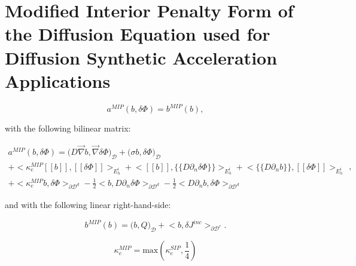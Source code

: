 \section{Modified Interior Penalty Form of the Diffusion Equation used for Diffusion Synthetic Acceleration Applications}
\label{sec::DSA_MIP}

\begin{equation}
a^{MIP}( b, \delta \Phi) = b^{MIP}(b),
\label{eq::MIP_weak_form}
\end{equation}

\noindent with the following bilinear matrix:

\begin{equation}
\label{eq::MIP_bilinear_form}
\begin{aligned}
a^{MIP}(b, \delta \Phi)  = \Big(  D \vec{\nabla} b , \vec{\nabla} \delta \Phi  \Big)_{\mathcal{D}} + \Big(  \sigma b , \delta \Phi  \Big)_{\mathcal{D}}    \\
+  \Big< \kappa_e^{MIP} [\![   b ]\!] , [\![  \delta \Phi ]\!]\Big>_{E_h^i} + \Big<  [\![  b ]\!] , \{\!\{  D \partial_n \delta \Phi \}\!\}\Big>_{E_h^i}  + \Big< \{\!\{  D \partial_n b \}\!\} , [\![ \delta \Phi ]\!]\Big>_{E_h^i} \\
+ \Big< \kappa_e^{MIP}  b , \delta  \Phi \Big>_{\partial \mathcal{D}^d} - \frac{1}{2} \Big<  b ,  D \partial_n \delta \Phi \Big>_{\partial \mathcal{D}^d} - \frac{1}{2} \Big<   D \partial_n b , \delta \Phi \Big>_{\partial \mathcal{D}^d}  
\end{aligned} ,
\end{equation}

\noindent and with the following linear right-hand-side:

\begin{equation}
\label{eq::MIP_linear_form}
b^{MIP} (b) = \Big(  b, Q  \Big)_{\mathcal{D}}  + \Big< b, \delta  J^{inc}  \Big>_{\partial \mathcal{D}^r} .
\end{equation}


\begin{equation}
\label{eq::MIP_penalty_term}
\kappa_e^{MIP} = \text{max} \left( \kappa_e^{SIP}, \frac{1}{4} \right)
\end{equation}

